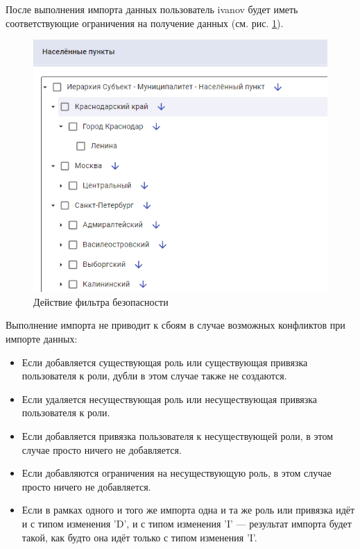 \documentclass[../user-manual.tex]{subfiles}
\begin{document}
	После выполнения импорта данных пользователь ivanov будет иметь соответствующие ограничения на получение данных (см. рис. \ref{fig:asm-role-action}).

	\begin{figure}[h]
		\centering
		\includegraphics[width=\graphicswidth]{img/24-asm-role-action.png}
		\caption{Действие фильтра безопасности}
		\label{fig:asm-role-action}
	\end{figure}

	Выполнение импорта не приводит к сбоям в случае возможных конфликтов при импорте данных:
		\begin{itemize}
			\item Если добавляется существующая роль или существующая привязка пользователя к роли, дубли в этом случае также не создаются.
			\item Если удаляется несуществующая роль или несуществующая привязка пользователя к роли.
			\item Если добавляется привязка пользователя к несуществующей роли, в этом случае просто ничего не добавляется.
			\item Если добавляются ограничения на несуществующую роль, в этом случае просто ничего не добавляется.
			\item Если в рамках одного и того же импорта одна и та же роль или привязка идёт и с типом изменения 'D', и с типом изменения 'I' --- результат импорта будет такой, как будто она идёт только с типом изменения 'I'.
		\end{itemize}
\end{document}
